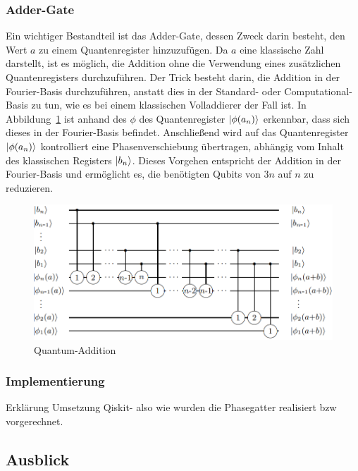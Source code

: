 \documentclass[lettersize,journal]{IEEEtran}
\begin{document}
\subsubsection{Adder-Gate}
Ein wichtiger Bestandteil ist das Adder-Gate, dessen Zweck darin besteht,
den Wert \(a\) zu einem Quantenregister hinzuzufügen.
Da \(a\) eine klassische Zahl darstellt, ist es möglich,
die Addition ohne die Verwendung eines zusätzlichen Quantenregisters durchzuführen.
Der Trick besteht darin, die Addition in der Fourier-Basis durchzuführen,
anstatt dies in der Standard- oder Computational-Basis zu tun,
wie es bei einem klassischen Volladdierer der Fall ist.
In Abbildung~\ref{fig:Quantum-Addition} ist anhand des \(\phi\) des Quantenregister \(\ket{\phi(a_n)}\) erkennbar,
dass sich dieses in der Fourier-Basis befindet.
Anschließend wird auf das Quantenregister \(\ket{\phi(a_n)}\) kontrolliert eine Phasenverschiebung übertragen,
abhängig vom Inhalt des klassischen Registers \(\ket{b_n}\).
Dieses Vorgehen entspricht der Addition in der Fourier-Basis und ermöglicht es,
die benötigten Qubits von \(3n\) auf \(n\) zu reduzieren.
\begin{figure}[h]
\caption{Quantum-Addition~\cite{draper2000addition}}
\label{fig:Quantum-Addition}
\includegraphics[width=\linewidth]{Quantum-Addition.PNG}
\centering
\end{figure}
\subsubsection{Implementierung}
Erklärung Umsetzung Qiskit- also wie wurden die Phasegatter realisiert bzw vorgerechnet. 


\subsection{Ausblick}



\end{document}
